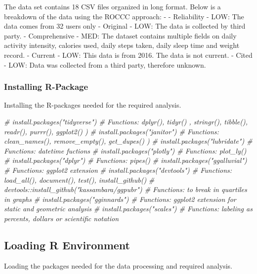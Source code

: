 \documentclass[
]{article}
\newenvironment{Shaded}{\begin{snugshade}}{\end{snugshade}}
\newcommand{\CommentTok}[1]{\textcolor[rgb]{0.56,0.35,0.01}{\textit{#1}}}
\begin{document}
The data set contains 18 CSV files organized in long format. Below is a
breakdown of the data using the ROCCC approach: - - Reliability - LOW:
The data comes from 32 users only - Original - LOW: The data is
collected by third party. - Comprehensive - MED: The dataset contains
multiple fields on daily activity intensity, calories used, daily steps
taken, daily sleep time and weight record. - Current - LOW: This data is
from 2016. The data is not current. - Cited - LOW: Data was collected
from a third party, therefore unknown.

\hypertarget{installing-r-package}{%
\subsubsection{Installing R-Package}\label{installing-r-package}}

Installing the R-packages needed for the required analysis.

\begin{Shaded}
\begin{Highlighting}[]
  \CommentTok{\# install.packages("tidyverse")   \#   Functions: dplyr(), tidyr() , stringr(), tibble(), readr(), purrr(), ggplot2() )}
  \CommentTok{\# install.packages("janitor")     \#   Functions: clean\_names(), remove\_empty(), get\_dupes() )}
  \CommentTok{\# install.packages("lubridate")   \#   Functions: datetime fuctions }
  \CommentTok{\# install.packages("plotly")      \#   Functions: plot\_ly()}
  \CommentTok{\# install.packages("dplyr")       \#   Functions: pipes()}
  \CommentTok{\# install.packages("ggalluvial")  \#   Functions: ggplot2 extension }
  \CommentTok{\# install.packages("devtools")    \#   Functions: load\_all(), document(), test(), install\_github()}
  \CommentTok{\# devtools::install\_github("kassambara/ggpubr") \#   Functions: to break in quartiles in graphs}
  \CommentTok{\# install.packages("gginnards")   \#   Functions: ggplot2 extension for static and geometric analysis}
  \CommentTok{\# install.packages("scales")      \#   Functions: labeling as percents, dollars or scientific notation}
\end{Highlighting}
\end{Shaded}

\hypertarget{loading-r-environment}{%
\subsection{Loading R Environment}\label{loading-r-environment}}

Loading the packages needed for the data processing and required
analysis.
\end{document}
